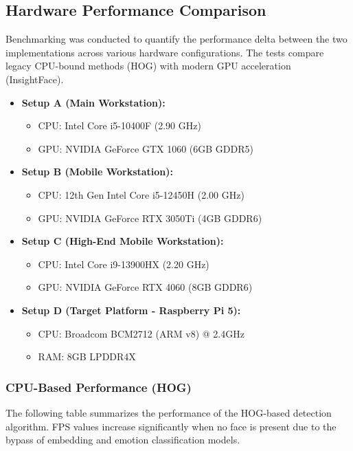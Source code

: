 \documentclass{article}
\begin{document}
\subsection{Hardware Performance Comparison}
Benchmarking was conducted to quantify the performance delta between the two implementations across various hardware configurations. The tests compare legacy CPU-bound methods (HOG) with modern GPU acceleration (InsightFace).

\begin{itemize}
    \item \textbf{Setup A (Main Workstation):}
    \begin{itemize}
        \item CPU: Intel Core i5-10400F (2.90 GHz)
        \item GPU: NVIDIA GeForce GTX 1060 (6GB GDDR5)
    \end{itemize}
    
    \item \textbf{Setup B (Mobile Workstation):}
    \begin{itemize}
        \item CPU: 12th Gen Intel Core i5-12450H (2.00 GHz)
        \item GPU: NVIDIA GeForce RTX 3050Ti (4GB GDDR6)
    \end{itemize}

    \item \textbf{Setup C (High-End Mobile Workstation):}
    \begin{itemize}
        \item CPU: Intel Core i9-13900HX (2.20 GHz)
        \item GPU: NVIDIA GeForce RTX 4060 (8GB GDDR6)
    \end{itemize}

    \item \textbf{Setup D (Target Platform - Raspberry Pi 5):}
    \begin{itemize}
        \item CPU: Broadcom BCM2712 (ARM v8) @ 2.4GHz
        \item RAM: 8GB LPDDR4X
    \end{itemize}
\end{itemize}

\subsubsection{CPU-Based Performance (HOG)}
The following table summarizes the performance of the HOG-based detection algorithm. FPS values increase significantly when no face is present due to the bypass of embedding and emotion classification models.
\end{document}
